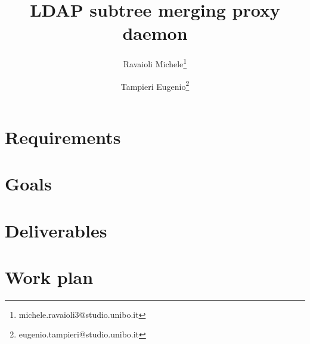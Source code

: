 \documentclass[a4paper,12pt]{article}
\title{LDAP subtree merging proxy daemon}
\author{Ravaioli Michele\thanks{michele.ravaioli3@studio.unibo.it} \and Tampieri Eugenio\thanks{eugenio.tampieri@studio.unibo.it}}
\begin{document}
    \maketitle
    \begin{abstract}
    \end{abstract}
    \section{Requirements}
    \section{Goals}
    \section{Deliverables}
    \section{Work plan}
\end{document}
